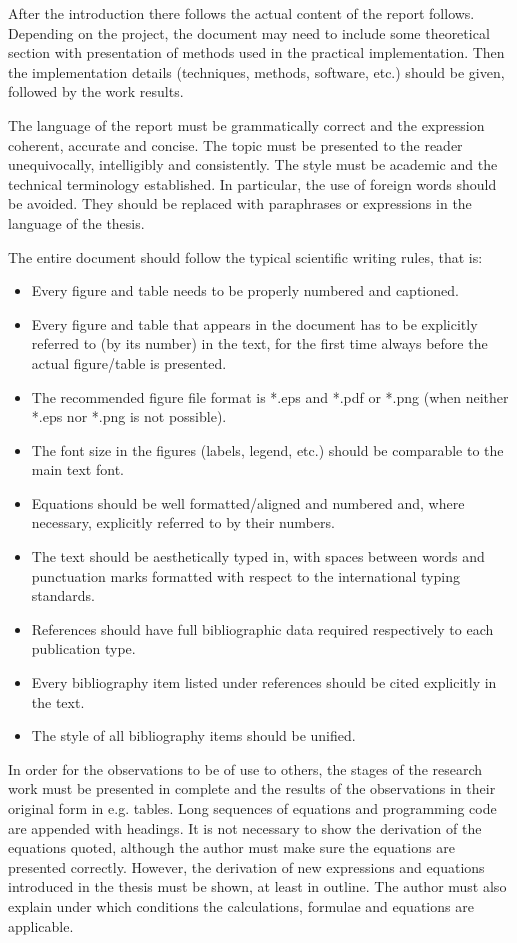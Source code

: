 \documentclass[12pt,oneside,a4paper]{article}
\begin{document}
After the introduction there follows the actual content of the report follows. 
Depending on the project, the document may need to include
some theoretical section with presentation of methods used in the practical implementation.
Then the implementation details (techniques, methods, software, etc.) should be given,
followed by the work results.

The language of the report must be grammatically correct and the expression coherent, accurate
and concise. The topic must be presented to the reader unequivocally, intelligibly and consistently.
The style must be academic and the technical terminology established. In particular, the use of
foreign words should be avoided. They should be replaced with paraphrases or expressions in the
language of the thesis.

The entire document should follow the typical scientific writing rules, that is:
\begin{itemize}
\item Every figure and table needs to be properly numbered and captioned.
\item Every figure and table that appears in the document has to be explicitly referred to (by its number) 
in the text, for the first time always before the actual figure/table is presented.
\item The recommended figure file format is *.eps and *.pdf or *.png (when neither *.eps nor *.png is not possible).
\item The font size in the figures (labels, legend, etc.) should be comparable to the main text font.
\item Equations should be well formatted/aligned and numbered and, where necessary, explicitly referred to by their numbers.
\item The text should be aesthetically typed in, with spaces between words and punctuation marks formatted
with respect to the international typing standards.
\item References should have full bibliographic data required respectively to each publication type.
\item Every bibliography item listed under references should be cited explicitly in the text.
\item The style of all bibliography items should be unified.
\end{itemize}

In order for the observations to be of use to others, the stages of the research work must be
presented in complete and the results of the observations in their original form in e.g. tables. Long
sequences of equations and programming code are appended with headings. It is not necessary to
show the derivation of the equations quoted, although the author must make sure the equations are
presented correctly. However, the derivation of new expressions and equations introduced in the
thesis must be shown, at least in outline. The author must also explain under which conditions the
calculations, formulae and equations are applicable.
\end{document}
